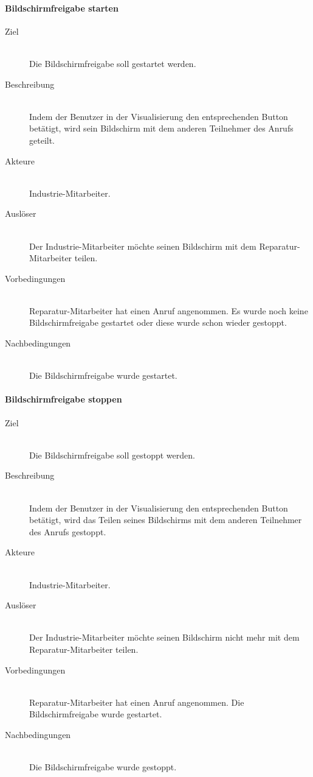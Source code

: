\paragraph{Bildschirmfreigabe starten}
    \begin{description}
        \item[Ziel]\hfill \\
        Die Bildschirmfreigabe soll gestartet werden.
        \item[Beschreibung]\hfill \\
        Indem der Benutzer in der Visualisierung den entsprechenden Button betätigt, wird sein Bildschirm mit dem anderen Teilnehmer des Anrufs geteilt.
        \item[Akteure]\hfill \\
        Industrie-Mitarbeiter.
        \item[Auslöser]\hfill \\
        Der Industrie-Mitarbeiter möchte seinen Bildschirm mit dem Reparatur-Mitarbeiter teilen.
        \item[Vorbedingungen]\hfill \\
        Reparatur-Mitarbeiter hat einen Anruf angenommen.
        Es wurde noch keine Bildschirmfreigabe gestartet oder diese wurde schon wieder gestoppt.
        \item[Nachbedingungen]\hfill \\
        Die Bildschirmfreigabe wurde gestartet.
        \end{description}

\paragraph{Bildschirmfreigabe stoppen}
    \begin{description}
        \item[Ziel]\hfill \\
        Die Bildschirmfreigabe soll gestoppt werden.
        \item[Beschreibung]\hfill \\
        Indem der Benutzer in der Visualisierung den entsprechenden Button betätigt, wird das Teilen seines Bildschirms mit dem anderen Teilnehmer des Anrufs gestoppt.
        \item[Akteure]\hfill \\
        Industrie-Mitarbeiter.
        \item[Auslöser]\hfill \\
        Der Industrie-Mitarbeiter möchte seinen Bildschirm nicht mehr mit dem Reparatur-Mitarbeiter teilen.
        \item[Vorbedingungen]\hfill \\
        Reparatur-Mitarbeiter hat einen Anruf angenommen.
        Die Bildschirmfreigabe wurde gestartet.
        \item[Nachbedingungen]\hfill \\
        Die Bildschirmfreigabe wurde gestoppt.
        \end{description}

